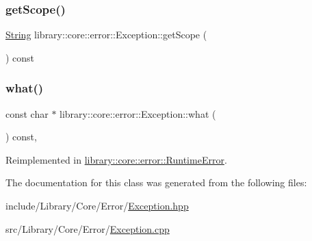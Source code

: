 \subsubsection{\texorpdfstring{get\+Scope()}{getScope()}}
{\footnotesize\ttfamily \hyperlink{classlibrary_1_1core_1_1types_1_1String}{String} library\+::core\+::error\+::\+Exception\+::get\+Scope (\begin{DoxyParamCaption}{ }\end{DoxyParamCaption}) const}

\mbox{\label{classlibrary_1_1core_1_1error_1_1Exception_ab318a927162519b15961ca66be07fd6b}} 
\subsubsection{\texorpdfstring{what()}{what()}}
{\footnotesize\ttfamily const char $\ast$ library\+::core\+::error\+::\+Exception\+::what (\begin{DoxyParamCaption}{ }\end{DoxyParamCaption}) const\hspace{0.3cm}{\ttfamily [virtual]}, {\ttfamily [noexcept]}}



Reimplemented in \hyperlink{classlibrary_1_1core_1_1error_1_1RuntimeError_af3da31cf67f3f5e120c5db9072e3a801}{library\+::core\+::error\+::\+Runtime\+Error}.



The documentation for this class was generated from the following files\+:\begin{DoxyCompactItemize}
\item 
include/\+Library/\+Core/\+Error/\hyperlink{Exception_8hpp}{Exception.\+hpp}\item 
src/\+Library/\+Core/\+Error/\hyperlink{Exception_8cpp}{Exception.\+cpp}\end{DoxyCompactItemize}
